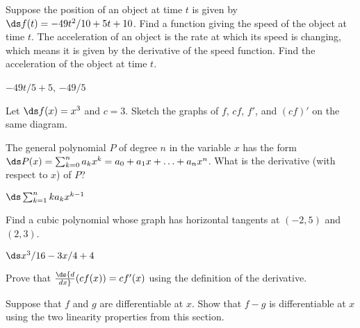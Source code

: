 \begin{exercises}
\begin{exercise} Suppose the position of an object at time $t$ is  given by
$\ds f(t)=-49 t^2/10+5t+10$. Find a function giving the speed of the object
at time $t$. The acceleration of an object is the rate at which its
speed is changing, which means it is given by the derivative of the
speed function. Find the acceleration of the object at time $t$.
\begin{answer} $-49t/5+5$, $-49/5$
\end{answer}\end{exercise}

\begin{exercise} Let $\ds f(x) =x^3$ and $c= 3$. Sketch the graphs of $f$,
$cf$, $f'$, and $(cf)'$ on the same diagram.
\end{exercise}

\begin{exercise} The general polynomial $P$ of degree $n$ in the variable $x$
has the form $\ds P(x)= \sum _{k=0 } ^n a_k x^k = a_0 + a_1 x + \ldots
+ a_n x^n$. What is the derivative (with respect to $x$)
of $P$?
\begin{answer} $\ds\sum_{k=1}^n ka_kx^{k-1}$
\end{answer}\end{exercise}

\begin{exercise} Find a cubic polynomial whose graph has horizontal tangents at
$(-2 , 5)$ and $(2, 3)$.
\begin{answer} $\ds x^3/16-3x/4+4$
\end{answer}\end{exercise}
 
\begin{exercise} Prove that $\ds{d\over dx}(cf(x))= cf'(x)$ using the
definition of the derivative.
\end{exercise}

\begin{exercise} Suppose that $f$ and $g$ are differentiable at $x$. Show
that $f-g$ is differentiable at $x$ using the two linearity
properties from this section.
\end{exercise}

\end{exercises}


